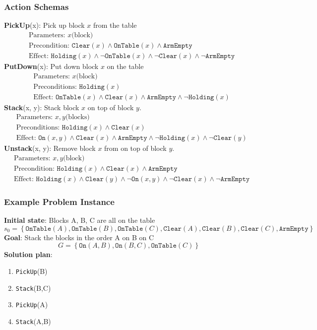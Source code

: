 \documentclass[a4paper]{article}
\theoremstyle{definition}
\begin{document}
\subsubsection{Action Schemas}
\textbf{PickUp}(x): Pick up block \( x \) from the table 
\begin{align*}
    &\text{Parameters: } x \text{(block)} \\
    &\text{Precondition: } \texttt{Clear}(x) \wedge \texttt{OnTable}(x) \wedge \texttt{ArmEmpty} \\
    &\text{Effect: } \texttt{Holding}(x) \wedge \lnot \texttt{OnTable}(x) \wedge \lnot \texttt{Clear}(x) \wedge \lnot \texttt{ArmEmpty}
\end{align*}
\textbf{PutDown}(x): Put down block \( x \) on the table
\begin{align*}
    &\text{Parameters: } x \text{(block)} \\
    &\text{Preconditions: } \texttt{Holding}(x) \\
    &\text{Effect: } \texttt{OnTable}(x) \wedge \texttt{Clear}(x) \wedge \texttt{ArmEmpty} \wedge \lnot \texttt{Holding}(x)
\end{align*}
\textbf{Stack}(x, y): Stack block \( x \) on top of block \( y \).
\begin{align*}
    &\text{Parameters: } x,y \text{(blocks)} \\
    &\text{Preconditions: } \texttt{Holding}(x) \wedge \texttt{Clear}(x) \\
    &\text{Effect: } \texttt{On}(x,y) \wedge \texttt{Clear}(x) \wedge \texttt{ArmEmpty} \wedge \lnot \texttt{Holding}(x) \wedge \lnot \texttt{Clear}(y)
\end{align*}
\textbf{Unstack}(x, y): Remove block \( x \) from on top of block \( y \).
\begin{align*}
    &\text{Parameters: } x,y \text{(block)} \\
    &\text{Precondition: } \texttt{Holding}(x) \wedge \texttt{Clear}(x) \wedge \texttt{ArmEmpty} \\
    &\text{Effect: } \texttt{Holding}(x) \wedge \texttt{Clear}(y) \wedge \lnot \texttt{On}(x,y) \wedge \lnot \texttt{Clear}(x) \wedge \lnot \texttt{ArmEmpty}
\end{align*}

\subsubsection{Example Problem Instance}
\textbf{Initial state}: Blocks A, B, C are all on the table
\[
  s_0 = \left\{ \texttt{OnTable}(A), \texttt{OnTable}(B), \texttt{OnTable}(C), \texttt{Clear}(A), \texttt{Clear}(B), \texttt{Clear}(C), \texttt{ArmEmpty}\right\}
\]
\textbf{Goal}: Stack the blocks in the order A on B on C 
\[
  G = \left\{ \texttt{On}(A,B), \texttt{On}(B,C), \texttt{OnTable}(C)\right\}
\]
\textbf{Solution plan}:
\begin{enumerate}
    \item \texttt{PickUp}(B)
    \item \texttt{Stack}(B,C)
    \item \texttt{PickUp}(A)
    \item \texttt{Stack}(A,B)
\end{enumerate}
\end{document}
